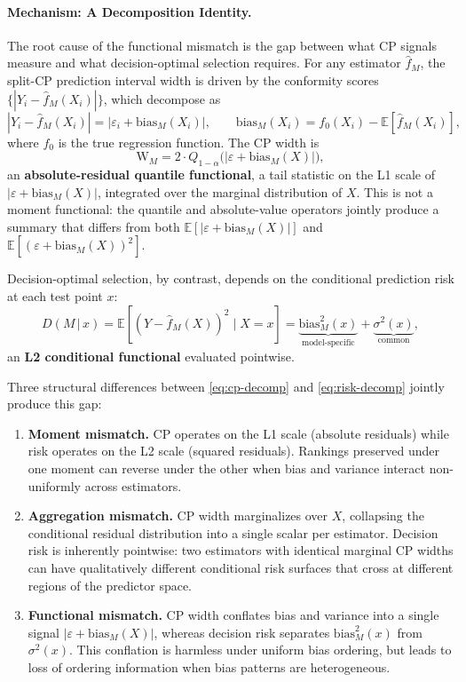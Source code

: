 \documentclass[pdflatex,sn-mathphys-ay]{sn-jnl}%
\theoremstyle{thmstyleone}%
\theoremstyle{thmstyletwo}%
\theoremstyle{thmstylethree}%
\begin{document}
\paragraph{Mechanism: A Decomposition Identity.}
The root cause of the functional mismatch is the gap between what CP signals measure and what decision-optimal selection requires. For any estimator $\hat{f}_M$, the split-CP prediction interval width is driven by the conformity scores $\{|Y_i - \hat{f}_M(X_i)|\}$, which decompose as
\begin{equation}
    |Y_i - \hat{f}_M(X_i)| = |\varepsilon_i + \text{bias}_M(X_i)|,
    \qquad \text{bias}_M(X_i) = f_0(X_i) - \mathbb{E}[\hat{f}_M(X_i)],
\end{equation}
where $f_0$ is the true regression function. The CP width is
\begin{equation}
    \text{W}_M = 2 \cdot Q_{1-\alpha}\bigl(|\varepsilon + \text{bias}_M(X)|\bigr),
    \label{eq:cp-decomp}
\end{equation}
an \textbf{absolute-residual quantile functional}, a tail statistic on the L1 scale of $|\varepsilon + \text{bias}_M(X)|$, integrated over the marginal distribution of $X$. This is not a moment functional: the quantile and absolute-value operators jointly produce a summary that differs from both $\mathbb{E}[|\varepsilon + \text{bias}_M(X)|]$ and $\mathbb{E}[(\varepsilon + \text{bias}_M(X))^2]$.

Decision-optimal selection, by contrast, depends on the conditional prediction risk at each test point $x$:
\begin{equation}
    D(M \,|\, x) = \mathbb{E}[(Y - \hat{f}_M(X))^2 \mid X = x] = \underbrace{\text{bias}_M^2(x)}_{\text{model-specific}} + \underbrace{\sigma^2(x)}_{\text{common}},
    \label{eq:risk-decomp}
\end{equation}
an \textbf{L2 conditional functional} evaluated pointwise.

Three structural differences between \eqref{eq:cp-decomp} and \eqref{eq:risk-decomp} jointly produce this gap:
\begin{enumerate}
    \item \textbf{Moment mismatch.} CP operates on the L1 scale (absolute residuals) while risk operates on the L2 scale (squared residuals). Rankings preserved under one moment can reverse under the other when bias and variance interact non-uniformly across estimators.
    \item \textbf{Aggregation mismatch.} CP width marginalizes over $X$, collapsing the conditional residual distribution into a single scalar per estimator. Decision risk is inherently pointwise: two estimators with identical marginal CP widths can have qualitatively different conditional risk surfaces that cross at different regions of the predictor space.
    \item \textbf{Functional mismatch.} CP width conflates bias and variance into a single signal $|\varepsilon + \text{bias}_M(X)|$, whereas decision risk separates $\text{bias}_M^2(x)$ from $\sigma^2(x)$. This conflation is harmless under uniform bias ordering, but leads to loss of ordering information when bias patterns are heterogeneous.
\end{enumerate}
\end{document}
